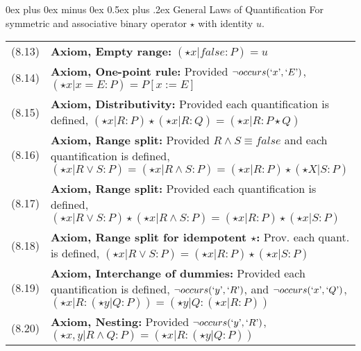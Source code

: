 \documentclass[letterpaper, 8pt]{extarticle}
\makeatletter
\renewcommand{\section}{\@startsection{section}{1}{0mm}%
                                {0ex plus 0ex minus 0ex}%
                                {0.5ex plus .2ex}%
                                {\normalfont\normalsize\bfseries}}
\makeatother
\begin{document}
\begin{multicols*}{3}
    \section{General Laws of Quantification}
    For symmetric and associative binary operator $\star $ with identity $u$.
    \begin{tabulary}{\linewidth}{@{}lL@{}}
        (8.13) & \textbf{Axiom, Empty range:} $(\star x | false : P) = u$                                                                                                                                                                                   \\
        (8.14) & \textbf{Axiom, One-point rule:} Provided $\neg occurs(`x\textrm', `E\textrm')$, $(\star x | x = E : P) = P[x := E]$                                                                                                                        \\
        (8.15) & \textbf{Axiom, Distributivity:} Provided each quantification is defined, $(\star x | R:P) \star  (\star x | R : Q) = (\star x | R : P \star  Q)$                                                                                           \\
        (8.16) & \textbf{Axiom, Range split:} Provided $R \land S \equiv false$ and each quantification is defined, $(\star x | R \lor S : P) = (\star x | R \land S : P) = (\star x | R : P) \star  (\star X | S : P)$                                     \\
        (8.17) & \textbf{Axiom, Range split:} Provided each quantification is defined, $(\star x | R \lor S : P) \star  (\star x | R \land S : P) = (\star x | R : P) \star  (\star x | S : P)$                                                             \\
        (8.18) & \textbf{Axiom, Range split for idempotent $\star$:} Prov. each quant. is defined, $(\star x | R \lor S : P) = (\star x | R : P) \star (\star x | S : P)$                                                                                   \\
        (8.19) & \textbf{Axiom, Interchange of dummies:} Provided each quantification is defined, $\neg occurs(`y\textrm', `R\textrm')$, and $\neg occurs(`x\textrm', `Q\textrm')$, $(\star x | R : (\star y | Q : P)) = (\star y | Q : (\star x | R : P))$ \\
        (8.20) & \textbf{Axiom, Nesting:} Provided $\neg occurs(`y\textrm', `R\textrm')$, $(\star x, y | R \land Q : P) = (\star x | R : (\star y | Q : P))$                                                                                                \\

\end{tabulary}
\end{multicols*}
\end{document}
